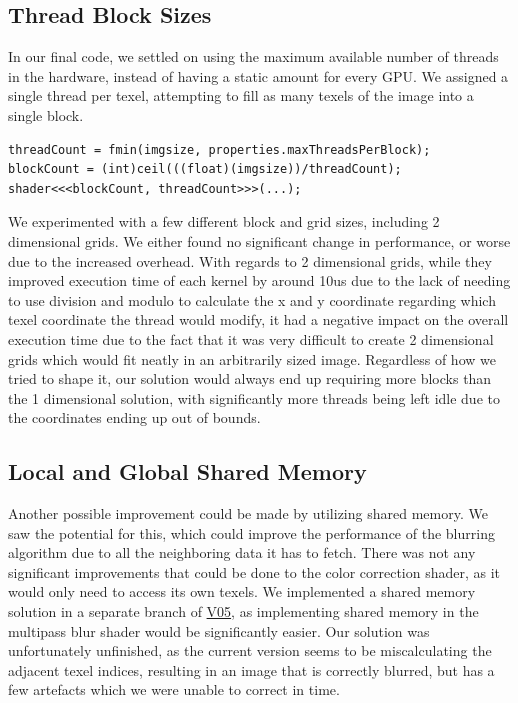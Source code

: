 \documentclass[10pt,journal,compsoc]{IEEEtran}
\begin{document}
\subsection{Thread Block Sizes}

\noindent In our final code, we settled on using the maximum available number of threads in the hardware, instead of having a static amount for every GPU. We assigned a single thread per texel, attempting to fill as many texels of the image into a single block.  \\

\begin{lstlisting}[basicstyle=\small]
threadCount = fmin(imgsize, properties.maxThreadsPerBlock);
blockCount = (int)ceil(((float)(imgsize))/threadCount);
shader<<<blockCount, threadCount>>>(...);
\end{lstlisting}

\noindent We experimented with a few different block and grid sizes, including 2 dimensional grids. We either found no significant change in performance, or worse due to the increased overhead. With regards to 2 dimensional grids, while they improved execution time of each kernel by around 10us due to the lack of needing to use division and modulo to calculate the x and y coordinate regarding which texel coordinate the thread would modify, it had a negative impact on the overall execution time due to the fact that it was very difficult to create 2 dimensional grids which would fit neatly in an arbitrarily sized image. Regardless of how we tried to shape it, our solution would always end up requiring more blocks than the 1 dimensional solution, with significantly more threads being left idle due to the coordinates ending up out of bounds.


\subsection{Local and Global Shared Memory}

\noindent Another possible improvement could be made by utilizing shared memory. We saw the potential for this, which could improve the performance of the blurring algorithm due to all the neighboring data it has to fetch. There was not any significant improvements that could be done to the color correction shader, as it would only need to access its own texels. We implemented a shared memory solution in a separate branch of \hyperref[sec:V05]{V05}, as implementing shared memory in the multipass blur shader would be significantly easier. Our solution was unfortunately unfinished, as the current version seems to be miscalculating the adjacent texel indices, resulting in an image that is correctly blurred, but has a few artefacts which we were unable to correct in time. \\
\end{document}
